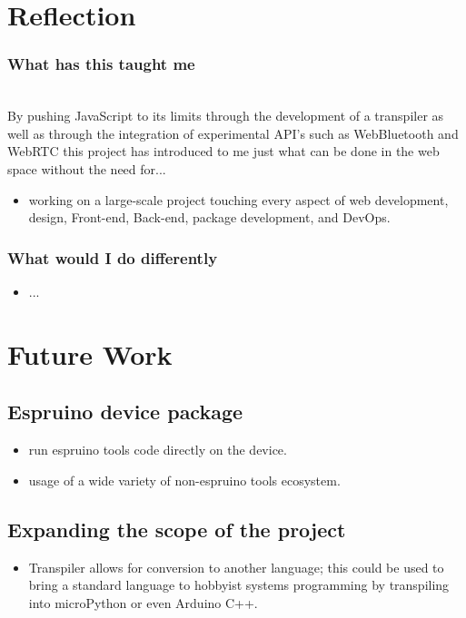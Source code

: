 \documentclass{l4proj}
\begin{document}
\section{Reflection}
\subsubsection{What has this taught me}\hfill\\
By pushing JavaScript to its limits through the development of a transpiler as well as through the integration of experimental API's such as WebBluetooth and WebRTC this project has introduced to me just what can be done in the web space without the need for...
\begin{itemize}
    \item working on a large-scale project touching every aspect of web development, design, Front-end, Back-end, package development, and DevOps.
\end{itemize}
\subsubsection{What would I do differently}\hfill
\begin{itemize}
    \item ...
\end{itemize}
\section{Future Work}
\subsection{Espruino device package}
\begin{itemize}
    \item run espruino tools code directly on the device.
    \item usage of a wide variety of non-espruino tools ecosystem.
\end{itemize}

\subsection{Expanding the scope of the project}
\begin{itemize}
    \item Transpiler allows for conversion to another language; this could be used to bring a standard language to hobbyist systems programming by transpiling into microPython or even Arduino C++.
\end{itemize}
\end{document}

